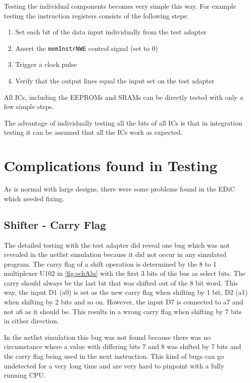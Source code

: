 Testing the individual components becomes very simple this way.
For example testing the instruction registers consists of the following steps:
\begin{enumerate}
  \item Set each bit of the data input individually from the test adapter
  \item Assert the \texttt{memInstrNWE} control signal (set to 0)
  \item Trigger a clock pulse
  \item Verify that the output lines equal the input set on the test adapter
\end{enumerate}
All \glspl{IC}, including the \glspl{EEPROM} and \glspl{SRAM} can be directly tested with only a few simple steps.

The advantage of individually testing all the bits of all \glspl{IC} is that in integration testing it can be assumed that all the \glspl{IC} work as expected.
\section{Complications found in Testing}\label{sec:switchGlitch}
As is normal with large designs, there were some problems found in the \gls{EDiC} which needed fixing.
\subsection{Shifter - Carry Flag}
The detailed testing with the test adapter did reveal one bug which was not revealed in the netlist simulation because it did not occur in any simulated program.
The carry flag of a shift operation is determined by the 8 to 1 multiplexer U102 in \cref{fig:schAlu} with the first 3 bits of the bus as select bits.
The carry should always be the last bit that was shifted out of the 8 bit word.
This way, the input D1 (a0) is set as the new carry flag when shifting by 1 bit, D2 (a1) when shifting by 2 bits and so on.
However, the input D7 is connected to a7 and not a6 as it should be.
This results in a wrong carry flag when shifting by 7 bits in either direction.

In the netlist simulation this bug was not found because there was no circumstance where a value with differing bits 7 and 8 was shifted by 7 bits and the carry flag being used in the next instruction.
This kind of bugs can go undetected for a very long time and are very hard to pinpoint with a fully running \gls{CPU}.

